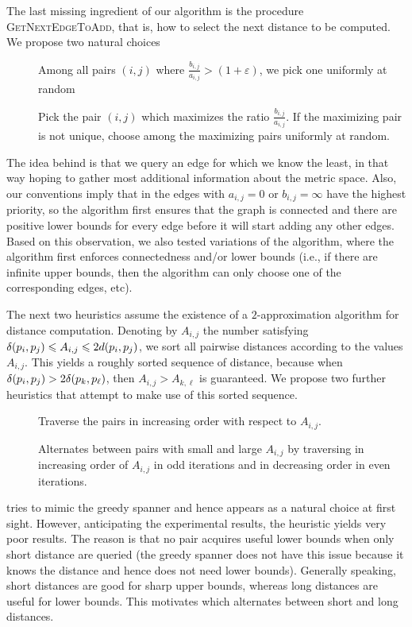 \documentclass[]{ws-ijcga}
\renewcommand{\leq}{\leqslant}
\newcommand{\eps}{\varepsilon}
\begin{document}
%
The last missing ingredient of our algorithm is the procedure \textsc{GetNextEdgeToAdd},
that is, how to select the next distance to be computed. We propose two natural choices
%
\begin{description}
\item[\brndm] Among all pairs $(i,j)$ where $\frac{b_{i,j}}{a_{i,j}}>(1+\eps)$,
we pick one uniformly at random
\item[\bgrdy] Pick the pair $(i,j)$ which maximizes the ratio $\frac{b_{i,j}}{a_{i,j}}$.
If the maximizing pair is not unique, choose among the maximizing pairs uniformly at random.
\end{description}
%
The idea behind \bgrdy is that we query an edge for which we know the least,
in that way hoping to gather most additional information about the metric space.
Also, our conventions imply that in \bgrdy the edges with $a_{i,j} = 0$ or $b_{i,j} = \infty$
have the highest priority, so the algorithm first ensures that the graph is connected and there are positive
lower bounds for every edge before it will start adding any other edges. Based on this observation,
we also tested variations of the \brndm algorithm, where the algorithm
first enforces connectedness and/or lower bounds (i.e., if there are infinite upper bounds,
then the algorithm can only choose one of the corresponding edges, etc).


The next two heuristics assume the existence of a $2$-approximation algorithm for distance
computation. Denoting by $A_{i,j}$ the number satisfying $\dist(p_i,p_j)\leq A_{i,j}\leq 2 d(p_i,p_j)$,
we sort all pairwise distances according to the values $A_{i,j}$.
This yields a roughly sorted sequence of distance, because when $\delta(p_i,p_j)>2\delta(p_k,p_\ell)$,
then $A_{i,j}>A_{k,\ell}$ is guaranteed.
We propose two further heuristics that attempt to make use of this sorted sequence.
\begin{description}
\item [\bqsgrdy] Traverse the pairs in increasing order with respect to $A_{i,j}$.
\item [\bqsshaker] Alternates between pairs with small and large $A_{i,j}$
by traversing in increasing order of $A_{i,j}$ in odd iterations and in decreasing order
in even iterations.
\end{description}

\bqsgrdy tries to mimic the greedy spanner and hence appears as a natural
choice at first sight. However, anticipating the experimental results, the heuristic yields very poor
results. The reason is that no pair acquires useful lower bounds when only short distance are queried
(the greedy spanner does not have this issue because it knows the distance and hence does not need
lower bounds).
Generally speaking, short distances are good for sharp upper bounds, whereas long distances are
useful for lower bounds. This motivates \bqsshaker
which alternates between short and long distances.
\end{document}
